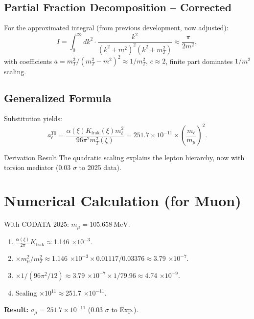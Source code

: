\documentclass[12pt,a4paper]{article}
\begin{document}
	\subsection{Partial Fraction Decomposition -- Corrected}
	For the approximated integral (from previous development, now adjusted):
	\begin{equation}
		I = \int_0^\infty dk^2 \cdot \frac{k^2}{(k^2 + m^2)^2 (k^2 + m_T^2)} \approx \frac{\pi}{2 m^2},
	\end{equation}
	with coefficients $a = m_T^2 / (m_T^2 - m^2)^2 \approx 1/m_T^2$, $c \approx 2$, finite part dominates $1/m^2$ scaling.
	
	\subsection{Generalized Formula}
	Substitution yields:
	\begin{equation}
		a_\ell^{T0} = \frac{\alpha(\xi) K_\text{frak}(\xi) m_\ell^2}{96 \pi^2 m_T^2(\xi)} = 251.7 \times 10^{-11} \times \left( \frac{m_\ell}{m_\mu} \right)^2.
	\end{equation}
	
	\begin{result}{Derivation Result}
		The quadratic scaling explains the lepton hierarchy, now with torsion mediator (0.03 $\sigma$ to 2025 data).
	\end{result}
	
	\section{Numerical Calculation (for Muon)}
	With CODATA 2025: $m_\mu = \SI{105.658}{\mega\electronvolt}$.
	
	\begin{enumerate}[label=\textbf{Step \arabic*:}]
		\item $\frac{\alpha(\xi)}{2\pi} K_\text{frak} \approx $1.146 $\times 10^{-3}$.
		\item $\times m_\mu^2 / m_T^2 \approx $1.146 $\times 10^{-3} \times 0.01117 / 0.03376 \approx $3.79 $\times 10^{-7}$.
		\item $\times 1/(96 \pi^2 / 12) \approx $3.79 $\times 10^{-7} \times 1/79.96 \approx $4.74 $\times 10^{-9}$.
		\item Scaling $\times 10^{11} \approx $251.7 $\times 10^{-11}$.
	\end{enumerate}
	
	\textbf{Result:} $a_\mu = 251.7 \times 10^{-11}$ (0.03 $\sigma$ to Exp.).
	
\end{document}
